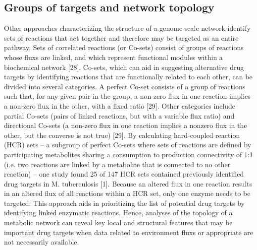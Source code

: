 \subsection{Groups of targets and network topology}
Other approaches characterizing the structure of a genome-scale 
network  identify sets of reactions that act 
together and therefore may be targeted as an entire pathway. 
Sets of correlated reactions (or Co-sets) consist of groups 
of reactions whose \glspl{flux} are linked, and which represent 
functional modules within a biochemical network [28]. Co-sets, 
which can aid in suggesting alternative drug targets by 
identifying reactions that are functionally related to each 
other, can be divided into several categories. A perfect 
Co-set consists of a group of reactions such that, for any 
given pair in the group, a non-zero \gls{flux} in one reaction 
implies a non-zero \gls{flux} in the other, with a fixed ratio [29]. 
Other categories include partial Co-sets (pairs of linked 
reactions, but with a variable \gls{flux} ratio) and directional 
Co-sets (a non-zero \gls{flux} in one reaction implies a nonzero 
\gls{flux} in the other, but the converse is not true) [29]. By 
calculating hard-coupled reaction (HCR) sets – a subgroup 
of perfect Co-sets where sets of reactions are defined by 
participating metabolites sharing a consumption to production 
connectivity of 1:1 (i.e. two reactions are linked by a 
metabolite that is connected to no other reaction) – one study 
found 25 of 147 HCR sets contained previously identified drug targets 
in M. tuberculosis [1]. Because an altered \gls{flux} in one reaction 
results in an altered \gls{flux} of all reactions within a HCR set, only 
one enzyme needs to be targeted. This approach aids in prioritizing 
the list of potential drug targets by identifying linked enzymatic 
reactions. Hence, analyses of the topology of a metabolic network 
can reveal key local and structural features that may be important 
drug targets when data related to environment \glspl{flux} or appropriate 
 are not necessarily available.

